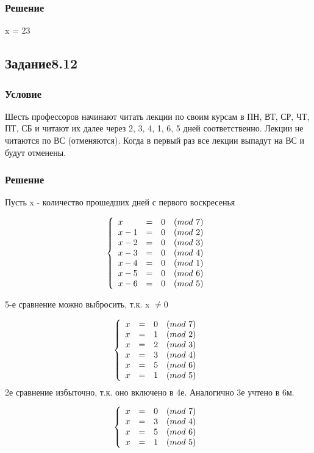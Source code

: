 \documentclass[10pt,a4paper]{article}
\begin{document}
\subsubsection*{Решение}
x = 23

\subsection*{Задание8.12}
\subsubsection*{Условие}
Шесть профессоров начинают читать лекции по своим курсам в ПН, ВТ, СР,
ЧТ, ПТ, СБ и читают их далее через 2, 3, 4, 1, 6, 5 дней
соответственно. Лекции не читаются по ВС (отменяются). Когда в первый
раз все лекции выпадут на ВС и будут отменены.
\subsubsection*{Решение}
Пусть x - количество прошедших дней с первого воскресенья

\[
\left\{ \begin{array}{llll}
x& = &0 &(mod\ 7)\\
x - 1& = &0 & (mod\ 2)\\
x - 2& = &0 &(mod\ 3)\\
x - 3& = &0 &(mod\ 4)\\
x - 4& = &0 &(mod\ 1)\\
x - 5& = &0 &(mod\ 6)\\
x - 6& = &0 &(mod\ 5)\\
\end{array}
\right. \\
\]

5-е сравнение можно выбросить, т.к. x $\neq 0$

\[
\left\{ \begin{array}{llll}
x& = &0 &(mod\ 7)\\
x & = &1& (mod\ 2)\\
x & = &2& (mod\ 3)\\
x & = &3& (mod\ 4)\\
x & = &5& (mod\ 6)\\
x & = &1& (mod\ 5)\\
\end{array}
\right. \\
\]
2е сравнение избыточно, т.к. оно включено в 4е. Аналогично 3е учтено в
6м. 

\[
\left\{ \begin{array}{llll}
x& = &0 &(mod\ 7)\\
x & = &3 &(mod\ 4)\\
x & = &5 &(mod\ 6)\\
x & = &1 &(mod\ 5)\\
\end{array}
\right. \\
\]
\end{document}
